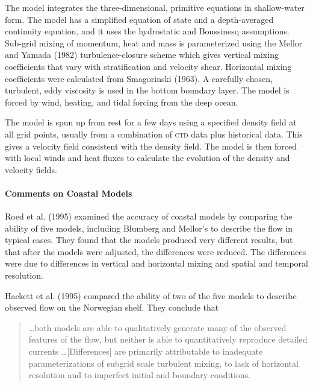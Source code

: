 The model integrates the three-dimensional, primitive equations in
shallow-water form. The model has a simplified equation of state and a
depth-averaged continuity equation, and it uses the hydrostatic and
Boussinesq assumptions. Sub-grid
mixing of
momentum, heat and mass is parameterized using the Mellor and Yamada
(1982) turbulence-closure scheme
which gives vertical mixing
coefficients that vary with stratification and velocity
shear. Horizontal mixing coefficients were calculated from Smagorinski (1963). A
carefully chosen, turbulent, eddy viscosity is used in the bottom
boundary layer. The model is forced by wind, heating, and tidal
forcing from the deep ocean.

The model is spun up from rest for a few days using a specified
density field at all grid points, usually from a combination of
\textsc{ctd} data plus historical data. This gives a
velocity field consistent with the density field. The model is then
forced with local winds and heat fluxes to calculate the evolution of
the density and velocity fields.

\paragraph{Comments on Coastal Models} Roed et al. (1995) examined the
accuracy of coastal models by
comparing the ability of five models, including Blumberg and Mellor's
to describe the flow in typical cases. They found that the models
produced very different results, but that after the models were
adjusted, the differences were reduced. The differences were due to
differences in vertical and horizontal mixing and spatial and temporal resolution.

Hackett et al. (1995) compared the ability of two of the five models
to describe observed flow on the Norwegian shelf. They conclude that
\begin{quote} \small
\ldots both models are able to qualitatively generate many of the
observed features of the flow, but neither is able to quantitatively
reproduce detailed currents \ldots [Differences] are primarily
attributable to inadequate parameterizations of subgrid scale
turbulent mixing, to lack of
horizontal resolution and to imperfect initial and boundary
conditions.
\end{quote}


